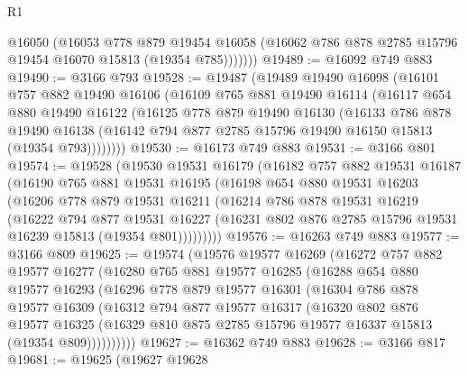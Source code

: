 \begin{lexlean}{R1}
\begin{coremodule}
            @16050
            (@16053
              @778
              @879
              @19454
              @16058
              (@16062 @786 @878 @2785 @15796 @19454 @16070 @15813 (@19354 @785)))))))
@19489 := @16092 @749 @883
@19490 := @3166 @793
@19528 := @19487
    (@19489
      @19490
      @16098
      (@16101
        @757
        @882
        @19490
        @16106
        (@16109
          @765
          @881
          @19490
          @16114
          (@16117
            @654
            @880
            @19490
            @16122
            (@16125
              @778
              @879
              @19490
              @16130
              (@16133
                @786
                @878
                @19490
                @16138
                (@16142 @794 @877 @2785 @15796 @19490 @16150 @15813 (@19354 @793))))))))
@19530 := @16173 @749 @883
@19531 := @3166 @801
@19574 := @19528
    (@19530
      @19531
      @16179
      (@16182
        @757
        @882
        @19531
        @16187
        (@16190
          @765
          @881
          @19531
          @16195
          (@16198
            @654
            @880
            @19531
            @16203
            (@16206
              @778
              @879
              @19531
              @16211
              (@16214
                @786
                @878
                @19531
                @16219
                (@16222
                  @794
                  @877
                  @19531
                  @16227
                  (@16231 @802 @876 @2785 @15796 @19531 @16239 @15813 (@19354 @801)))))))))
@19576 := @16263 @749 @883
@19577 := @3166 @809
@19625 := @19574
    (@19576
      @19577
      @16269
      (@16272
        @757
        @882
        @19577
        @16277
        (@16280
          @765
          @881
          @19577
          @16285
          (@16288
            @654
            @880
            @19577
            @16293
            (@16296
              @778
              @879
              @19577
              @16301
              (@16304
                @786
                @878
                @19577
                @16309
                (@16312
                  @794
                  @877
                  @19577
                  @16317
                  (@16320
                    @802
                    @876
                    @19577
                    @16325
                    (@16329 @810 @875 @2785 @15796 @19577 @16337 @15813 (@19354 @809))))))))))
@19627 := @16362 @749 @883
@19628 := @3166 @817
@19681 := @19625
    (@19627
      @19628

\end{coremodule}
\end{lexlean}
